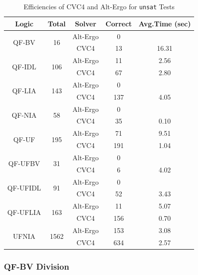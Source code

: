 \documentclass[10pt,letter]{article}
\theoremstyle{definition}
\begin{document}
\begin{table}
\small
\centering
\begin{tabular}{|cc|c|cc|}
\hline
\bf Logic & \bf Total &\bf Solver & \bf Correct & \bf Avg.Time \tiny{(sec)}\\\hline
\multirow{2}{*}{QF-BV} &\multirow{2}{*}{16} & Alt-Ergo & 0 & \\
&& CVC4 & 13 & 16.31 \\\hline
\multirow{2}{*}{QF-IDL} &\multirow{2}{*}{106} & Alt-Ergo & 11 & 2.56\\
&& CVC4 & 67 & 2.80 \\\hline
\multirow{2}{*}{QF-LIA} &\multirow{2}{*}{143} & Alt-Ergo & 0 & \\
&& CVC4 & 137 & 4.05\\\hline
\multirow{2}{*}{QF-NIA} &\multirow{2}{*}{58} & Alt-Ergo & 0 & \\
& & CVC4 & 35 & 0.10\\\hline
\multirow{2}{*}{QF-UF} & \multirow{2}{*}{195} & Alt-Ergo & 71 & 9.51\\
& & CVC4 &191 & 1.04\\\hline
\multirow{2}{*}{QF-UFBV} & \multirow{2}{*}{31} & Alt-Ergo & 0 & \\
& & CVC4 & 6 & 4.02\\\hline
\multirow{2}{*}{QF-UFIDL} & \multirow{2}{*}{91} & Alt-Ergo & 0 & \\
& & CVC4 & 52 & 3.43\\\hline
\multirow{2}{*}{QF-UFLIA} & \multirow{2}{*}{163} & Alt-Ergo & 11 & 5.07\\
& & CVC4 & 156 & 0.70\\\hline
\multirow{2}{*}{UFNIA} & \multirow{2}{*}{1562} &Alt-Ergo & 153 & 3.08\\
& & CVC4 & 634 & 2.57\\\hline
\end{tabular}
\caption{Efficiencies of CVC4 and Alt-Ergo for {\tt unsat} Tests}
\label{t:eff}
\end{table}



\subsubsection{QF-BV Division}
\end{document}

